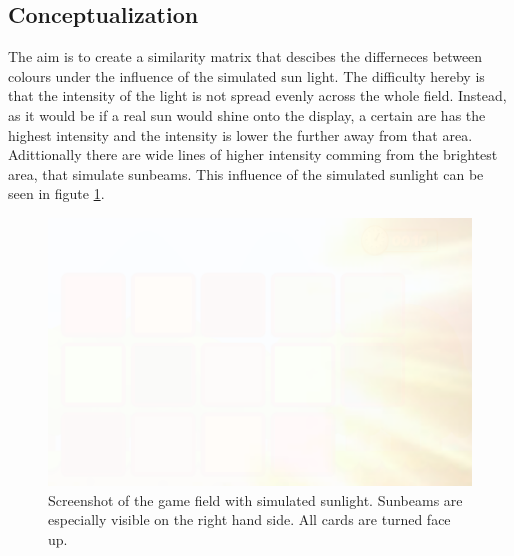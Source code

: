 \subsection{Conceptualization}
The aim is to create a similarity matrix that descibes the differneces between colours under the influence of the simulated sun light. The difficulty hereby is that the intensity of the light is not spread evenly across the whole field. Instead, as it would be if a real sun would shine onto the display, a certain are has the highest intensity and the intensity is lower the further away from that area. Adittionally there are wide lines of higher intensity comming from the brightest area, that simulate sunbeams. This influence of the simulated sunlight can be seen in figute \ref{fig:glareEffect}. 

\begin{figure}[H]
	\centering
	\includegraphics[width=15cm]{images/glareEffect.png}
	\caption[Bild kurz]{Screenshot of the game field with simulated sunlight. Sunbeams are especially visible on the right hand side. All cards are turned face up.}
	\label{fig:glareEffect}
\end{figure}

